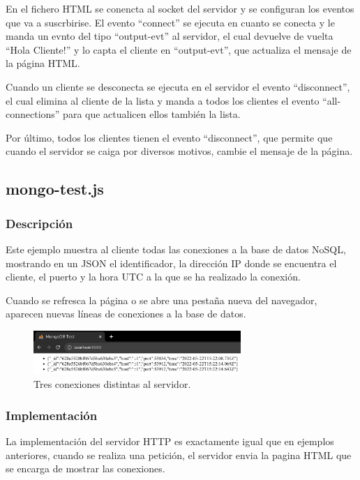 \documentclass{article}
\begin{document}
En el fichero HTML se conencta al socket del servidor y se configuran los eventos que va a suscrbirise. El evento ``connect'' se ejecuta en cuanto se conecta y le manda un evnto del tipo ``output-evt'' al servidor, el cual devuelve de vuelta ``Hola Cliente!'' y lo capta el cliente en ``output-evt'', que actualiza el mensaje de la página HTML.

Cuando un cliente se desconecta se ejecuta en el servidor el evento ``disconnect'', el cual elimina al cliente de la lista y manda a todos los clientes el evento ``all-connections'' para que actualicen ellos también la lista.

Por último, todos los clientes tienen el evento ``disconnect'', que permite que cuando el servidor se caiga por diversos motivos, cambie el mensaje de la página.



\subsection{mongo-test.js}
\subsubsection{Descripción}
Este ejemplo muestra al cliente todas las conexiones a la base de datos NoSQL, mostrando en un JSON el identificador, la dirección IP donde se encuentra el cliente, el puerto y la hora UTC a la que se ha realizado la conexión.

Cuando se refresca la página o se abre una pestaña nueva del navegador, aparecen nuevas líneas de conexiones a la base de datos.

\begin{figure}[H]
    \centering
    \includegraphics[width=0.7\textwidth]{images/mongo3.png}
    \caption{Tres conexiones distintas al servidor.}
\end{figure}

\subsubsection{Implementación}
La implementación del servidor HTTP es exactamente igual que en ejemplos anteriores, cuando se realiza una petición, el servidor envia la pagina HTML que se encarga de mostrar las conexiones.
\end{document}
